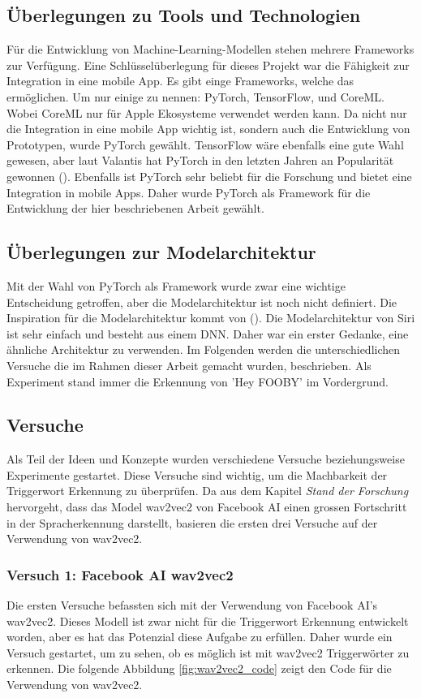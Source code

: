 \documentclass[11pt,a4paper]{article}
\begin{document}
\subsection{Überlegungen zu Tools und Technologien}
Für die Entwicklung von Machine-Learning-Modellen stehen mehrere Frameworks zur Verfügung. Eine 
Schlüsselüberlegung für dieses Projekt war die Fähigkeit zur Integration in eine mobile App.
Es gibt einge Frameworks, welche das ermöglichen. Um nur einige zu nennen: PyTorch, TensorFlow, und 
CoreML. Wobei CoreML nur für Apple Ekosysteme verwendet werden kann. Da nicht nur die Integration
in eine mobile App wichtig ist, sondern auch die Entwicklung von Prototypen, wurde PyTorch gewählt.
TensorFlow wäre ebenfalls eine gute Wahl gewesen, aber laut Valantis hat PyTorch in den letzten 
Jahren an Popularität gewonnen (\cite{valantis2023battle}). Ebenfalls ist PyTorch sehr beliebt für 
die Forschung und bietet eine Integration in mobile Apps. Daher wurde PyTorch als Framework für die 
Entwicklung der hier beschriebenen Arbeit gewählt.

\subsection{Überlegungen zur Modelarchitektur}
Mit der Wahl von PyTorch als Framework wurde zwar eine wichtige Entscheidung getroffen, aber die 
Modelarchitektur ist noch nicht definiert. Die Inspiration für die Modelarchitektur kommt von 
(\cite{siri2017hey}). Die Modelarchitektur von Siri ist sehr einfach und besteht aus einem DNN. 
Daher war ein erster Gedanke, eine ähnliche Architektur zu verwenden. Im Folgenden werden die 
unterschiedlichen Versuche die im Rahmen dieser Arbeit gemacht wurden, beschrieben. Als Experiment 
stand immer die Erkennung von 'Hey FOOBY' im Vordergrund.

\subsection{Versuche}
Als Teil der Ideen und Konzepte wurden verschiedene Versuche beziehungsweise Experimente gestartet. 
Diese Versuche sind wichtig, um die Machbarkeit der Triggerwort Erkennung zu überprüfen. Da aus dem 
Kapitel \textit{Stand der Forschung} hervorgeht, dass das Model wav2vec2 von Facebook AI einen grossen 
Fortschritt in der Spracherkennung darstellt, basieren die ersten drei Versuche auf der Verwendung 
von wav2vec2.


\subsubsection{Versuch 1: Facebook AI wav2vec2}
Die ersten Versuche befassten sich mit der Verwendung von Facebook AI's wav2vec2. Dieses Modell 
ist zwar nicht für die Triggerwort Erkennung entwickelt worden, aber es hat das Potenzial diese 
Aufgabe zu erfüllen. Daher wurde ein Versuch gestartet, um zu sehen, ob es möglich ist mit wav2vec2 
Triggerwörter zu erkennen. Die folgende Abbildung \ref{fig:wav2vec2_code} zeigt den Code 
für die Verwendung von wav2vec2. 
\end{document}
